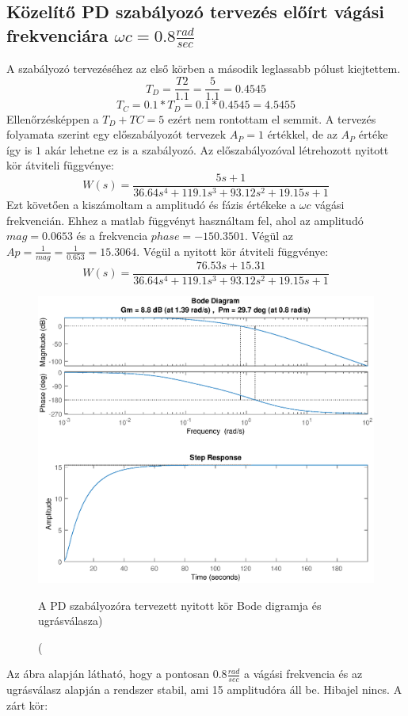 \documentclass[12pt]{article}
\begin{document}
\subsection{Közelítő PD szabályozó tervezés előírt vágási frekvenciára $\omega c=0.8\frac{rad}{sec}$}
A szabályozó  tervezéséhez az első körben a második leglassabb pólust kiejtettem.
\[T_D=\frac{T2}{1.1}=\frac{5}{1.1}=0.4545\]
\[T_C=0.1*T_D=0.1*0.4545=4.5455\]
Ellenőrzésképpen a $T_D+TC=5$ ezért nem rontottam el semmit. A tervezés folyamata szerint egy előszabályozót tervezek $A_P=1$ értékkel, de az $A_P$ értéke így is $1$ akár lehetne ez is a szabályozó. Az előszabályozóval létrehozott nyitott kör átviteli függvénye:
\[W(s)=\frac{5s+1}{36.64s^4+119.1s^3+93.12s^2+19.15s+1}\]
Ezt követően a kiszámoltam a amplitudó és fázis értékeke a $\omega c$ vágási frekvencián. Ehhez a matlab függvényt használtam fel, ahol az amplitudó $mag=0.0653$ és a frekvencia $phase=-150.3501$. Végül az $Ap=\frac{1}{mag}=\frac{1}{0.653}=15.3064$. Végül a nyitott kör átviteli függvénye:
\[W(s)=\frac{76.53s+15.31}{36.64s^4+119.1s^3+93.12s^2+19.15s+1}\]
\begin{figure}[H]
\centering
\includegraphics[scale=.70]{WPDOPEN}
\caption(A PD szabályozóra tervezett nyitott kör Bode digramja és ugrásválasza)
\end{figure}
Az ábra alapján látható, hogy a pontosan $0.8\frac{rad}{sec}$ a vágási frekvencia és az ugrásválasz alapján a rendszer stabil, ami 15 amplitudóra áll be. Hibajel nincs.
A zárt kör:
\end{document}
